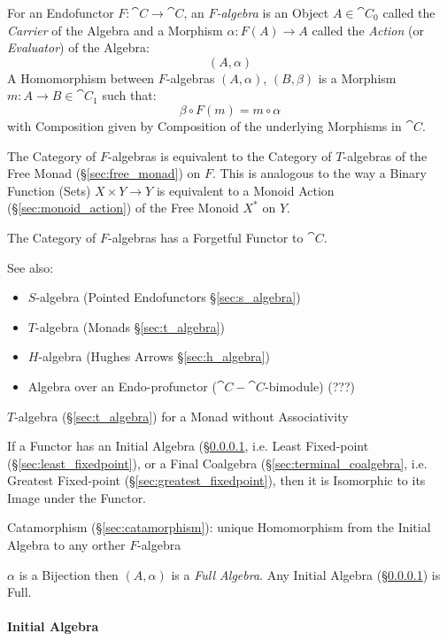 For an Endofunctor $F : \cat{C} \rightarrow \cat{C}$, an
\emph{$F$-algebra} is an Object $A \in \cat{C}_0$ called the
\emph{Carrier} of the Algebra and a Morphism $\alpha : F (A)
\rightarrow A$ called the \emph{Action} (or \emph{Evaluator}) of the
Algebra: \cite{corfield08}
\[
  (A,\alpha)
\]
A Homomorphism between $F$-algebras $(A,\alpha)$, $(B,\beta)$ is a
Morphism $m : A \rightarrow B \in \cat{C}_1$ such that:
\[
  \beta \circ F(m) = m \circ \alpha
\]
with Composition given by Composition of the underlying Morphisms in
$\cat{C}$.

The Category of $F$-algebras is equivalent to the Category of
$T$-algebras of the Free Monad (\S\ref{sec:free_monad}) on $F$. This
is analogous to the way a Binary Function (Sets) $X \times Y
\rightarrow Y$ is equivalent to a Monoid Action
(\S\ref{sec:monoid_action}) of the Free Monoid $X^*$ on $Y$.

The Category of $F$-algebras has a Forgetful Functor to $\cat{C}$.

\fist See also:
\begin{itemize}
  \item $S$-algebra (Pointed Endofunctors \S\ref{sec:s_algebra})
  \item $T$-algebra (Monads \S\ref{sec:t_algebra})
  \item $H$-algebra (Hughes Arrows \S\ref{sec:h_algebra})
  \item Algebra over an Endo-profunctor ($\cat{C}-\cat{C}$-bimodule)
    (???) %
\end{itemize}

$T$-algebra (\S\ref{sec:t_algebra}) for a Monad without Associativity

If a Functor has an Initial Algebra (\S\ref{sec:initial_algebra},
i.e. Least Fixed-point (\S\ref{sec:least_fixedpoint}), or a Final
Coalgebra (\S\ref{sec:terminal_coalgebra}, i.e. Greatest Fixed-point
(\S\ref{sec:greatest_fixedpoint}), then it is Isomorphic to its Image
under the Functor. \cite{corfield08}

Catamorphism (\S\ref{sec:catamorphism}): unique Homomorphism from the
Initial Algebra to any orther $F$-algebra

$\alpha$ is a Bijection then $(A,\alpha)$ is a \emph{Full Algebra}.
Any Initial Algebra (\S\ref{sec:initial_algebra}) is Full.
\cite{aczel88}



\paragraph{Initial Algebra}\label{sec:initial_algebra}\hfill

